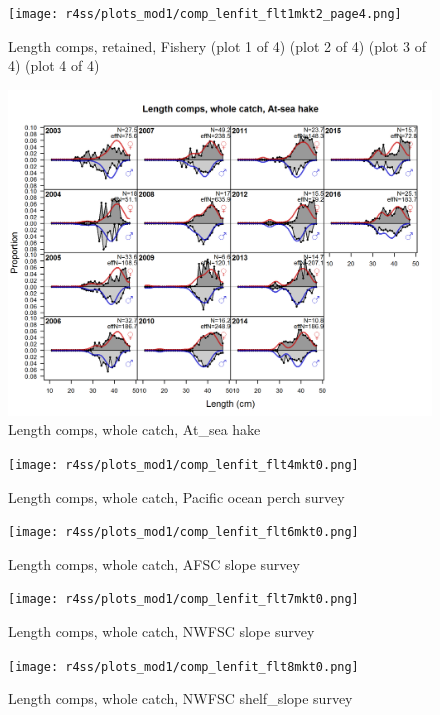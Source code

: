 \documentclass[12pt,]{article}
\begin{document}
\begin{figure}
\centering
\texttt{[image: r4ss/plots\_mod1/comp\_lenfit\_flt1mkt2\_page4.png]}
\caption{Length comps, retained, Fishery (plot 1 of 4) (plot 2 of 4)
(plot 3 of 4) (plot 4 of 4) \label{fig:length_fits}}
\end{figure}

\begin{figure}
\centering
\includegraphics{r4ss/plots_mod1/comp_lenfit_flt2mkt0.png}
\caption{Length comps, whole catch, At\_sea hake
\label{fig:length_fits}}
\end{figure}

\begin{figure}
\centering
\texttt{[image: r4ss/plots\_mod1/comp\_lenfit\_flt4mkt0.png]}
\caption{Length comps, whole catch, Pacific ocean perch survey
\label{fig:length_fits}}
\end{figure}

\begin{figure}
\centering
\texttt{[image: r4ss/plots\_mod1/comp\_lenfit\_flt6mkt0.png]}
\caption{Length comps, whole catch, AFSC slope survey
\label{fig:length_fits}}
\end{figure}

\begin{figure}
\centering
\texttt{[image: r4ss/plots\_mod1/comp\_lenfit\_flt7mkt0.png]}
\caption{Length comps, whole catch, NWFSC slope survey
\label{fig:length_fits}}
\end{figure}

\begin{figure}
\centering
\texttt{[image: r4ss/plots\_mod1/comp\_lenfit\_flt8mkt0.png]}
\caption{Length comps, whole catch, NWFSC shelf\_slope survey
\label{fig:length_fits}}
\end{figure}
\end{document}
